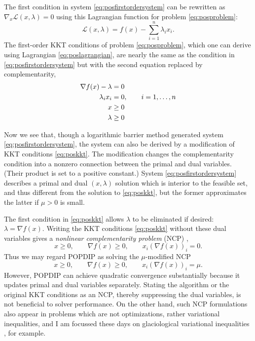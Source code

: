 \documentclass[11pt]{article}
\newcommand{\grad}{\nabla}
\begin{document}
The first condition in system \eqref{eq:posfirstordersystem} can be rewritten as $\grad_x \mathcal{L}(x,\lambda)=0$ using this Lagrangian function for problem \eqref{eq:posproblem}:
\begin{equation}
\mathcal{L}(x,\lambda) = f(x) - \sum_{i=1}^n \lambda_i x_i.  \label{eq:poslagrangian}
\end{equation}
The first-order KKT conditions \cite[sections 14.4, 14.5]{GrivaNashSofer2009} of problem \eqref{eq:posproblem}, which one can derive using Lagrangian \eqref{eq:poslagrangian}, are nearly the same as the condition in \eqref{eq:posfirstordersystem} but with the second equation replaced by complementarity,
\begin{align}
\grad f(x) - \lambda &= 0 \label{eq:poskkt} \\
\lambda_i x_i &= 0, \qquad i=1,\dots,n \notag \\
x &\ge 0 \notag \\
\lambda &\ge 0 \notag
\end{align}

Now we see that, though a logarithmic barrier method generated system \eqref{eq:posfirstordersystem}, the system can also be derived by a modification of KKT conditions \eqref{eq:poskkt}.  The modification changes the complementarity condition into a nonzero connection between the primal and dual variables.  (Their product is set to a positive constant.)  System \eqref{eq:posfirstordersystem} describes a primal and dual $(x,\lambda)$ solution which is interior to the feasible set, and thus different from the solution to \eqref{eq:poskkt}, but the former approximates the latter if $\mu>0$ is small.

The first condition in \eqref{eq:poskkt} allows $\lambda$ to be eliminated if desired: $\lambda = \grad f(x)$.  Writing the KKT conditions \eqref{eq:poskkt} without these dual variables gives a \emph{nonlinear complementarity problem} (NCP) \cite{FacchineiPang2007},
\begin{equation}
x \ge 0, \qquad \grad f(x) \ge 0, \qquad x_i (\grad f(x))_i = 0.  \label{eq:posncp}
\end{equation}
Thus we may regard POPDIP as solving the $\mu$-modified NCP
\begin{equation}
x \ge 0, \qquad \grad f(x) \ge 0, \qquad x_i (\grad f(x))_i = \mu. \label{eq:mumodifiedncp}
\end{equation}
However, POPDIP can achieve quadratic convergence substantially because it updates primal and dual variables separately.  Stating the algorithm or the original KKT conditions as an NCP, thereby suppressing the dual variables, is not beneficial to solver performance.  On the other hand, such NCP formulations also appear in problems which are not optimizations, rather variational inequalities, and I am focussed these days on glaciological variational inequalities \cite{Bueler2016,BuelerFarrell2024}, for example.
\end{document}
